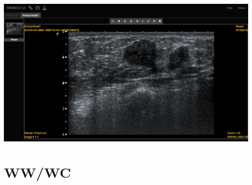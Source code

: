 \documentclass{tufte-book} %
\begin{document}
\hfill

\begin{center}
\includegraphics[width=\textwidth]{graphics/anon1_open.png}
\end{center}

\hfill

\chapter{WW/WC}
\end{document}
